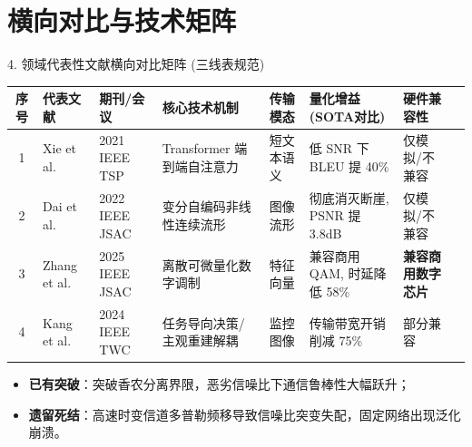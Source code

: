 \documentclass[aspectratio=169,10pt,UTF8]{ctexbeamer}
\begin{document}
\section{横向对比与技术矩阵}
\begin{frame}{4. 领域代表性文献横向对比矩阵 (三线表规范)}
  \centering
  \scriptsize
  \begin{tabular*}{\textwidth}{@{\extracolsep{\fill}}cllllllc@{}}
    \toprule
    \textbf{序号} & \textbf{代表文献} & \textbf{期刊/会议} & \textbf{核心技术机制} & \textbf{传输模态} & \textbf{量化增益 (SOTA对比)} & \textbf{硬件兼容性} \\
    \midrule
    1 & Xie et al.     & 2021 IEEE TSP  & Transformer 端到端自注意力 & 短文本语义 & 低 SNR 下 BLEU 提 40\% & 仅模拟/不兼容 \\
    2 & Dai et al.     & 2022 IEEE JSAC & 变分自编码非线性连续流形   & 图像流形   & 彻底消灭断崖, PSNR 提 3.8dB & 仅模拟/不兼容 \\
    3 & Zhang et al.   & 2025 IEEE JSAC & 离散可微量化数字调制       & 特征向量   & 兼容商用 QAM, 时延降低 58\% & \textbf{兼容商用数字芯片} \\
    4 & Kang et al.    & 2024 IEEE TWC  & 任务导向决策/主观重建解耦  & 监控图像   & 传输带宽开销削减 75\%   & 部分兼容 \\
    \bottomrule
  \end{tabular*}
  \vspace{0.3cm}
  \begin{itemize}
    \item \textbf{已有突破}：突破香农分离界限，恶劣信噪比下通信鲁棒性大幅跃升；
    \item \textbf{遗留死结}：高速时变信道多普勒频移导致信噪比突变失配，固定网络出现泛化崩溃。
  \end{itemize}
\end{frame}

\end{document}
